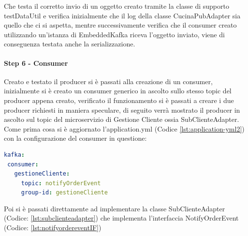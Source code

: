Che testa il corretto invio di un oggetto creato tramite la classe di supporto testDataUtil e verifica inizialmente che il log della classe CucinaPubAdapter sia quello che ci si aspetta, mentre successivamente verifica che il consumer creato utilizzando un’istanza di EmbeddedKafka riceva l’oggetto inviato, viene di conseguenza testata anche la serializzazione.
\paragraph{Step 6 - Consumer}
Creato e testato il producer si è passati alla creazione di un consumer, inizialmente si è creato un consumer generico in ascolto sullo stesso topic del producer appena creato, verificato il funzionamento si è passati a creare i due producer richiesti in maniera speculare, di seguito verrà mostrato il producer in ascolto sul topic del microservizio di Gestione Cliente ossia SubClienteAdapter.
Come prima cosa si è aggiornato l’application.yml (Codice \vref{lst:application-yml2}) con la configurazione del consumer in questione:
\begin{lstlisting}[language=yaml, caption={Aggiornamento del file `application.yml` per il consumer Kafka}, label=lst:application-yml2]
kafka:
 consumer:
   gestioneCliente:
     topic: notifyOrderEvent
     group-id: gestioneCliente
\end{lstlisting}
Poi si è passati direttamente ad implementare la classe SubClienteAdapter (Codice: \vref{lst:subclienteadapter})  che implementa l'interfaccia NotifyOrderEvent (Codice: \vref{lst:notifyordereventIF})  

